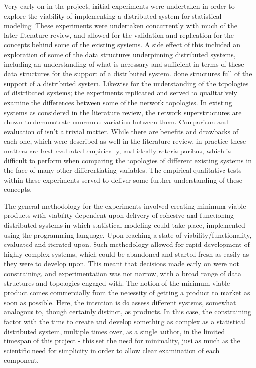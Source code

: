 Very early on in the project, initial experiments were undertaken in order to explore the viability of implementing a distributed system for statistical modeling. 
These experiments were undertaken concurrently with much of the later literature review, and allowed for the validation and replication for the concepts behind some of the existing systems.
A side effect of this included an exploration of some of the data structures underpinning distributed systems, including an understanding of what is necessary and sufficient in terms of these data structures for the support of a distributed system.
done structures full of the support of a distributed system.
Likewise for the understanding of the topologies of distributed systems; the experiments replicated and served to qualitatively examine the differences between some of the network topologies.
In existing systems as considered in the literature review, the network superstructures are shown to demonstrate enormous variation between them.
Comparison and evaluation of isn't a trivial matter.
While there are benefits and drawbacks of each one, which were described as well in the literature review, in practice these matters are best evaluated empirically, and ideally ceteris paribus, which is difficult to perform when comparing the topologies of different existing systems in the face of many other differentiating variables.
The empirical qualitative tests within these experiments served to deliver some further understanding of these concepts.

The general methodology for the experiments involved creating minimum viable products with viability dependent upon delivery of cohesive and functioning distributed systems in which statistical modeling could take place, implemented using the \R{} programming language.
Upon reaching a state of viability/functionality, evaluated and iterated upon.
Such methodology allowed for rapid development of highly complex systems, which could be abandoned and started fresh as easily as they were to develop upon.
This meant that decisions made early on were not constraining, and experimentation was not narrow, with a broad range of data structures and topologies engaged with.
The notion of the minimum viable product comes commercially from the necessity of getting a product to market as soon as possible.
Here, the intention is do assess different systems, somewhat analogous to, though certainly distinct, as products.
In this case, the constraining factor with the time to create and develop something as complex as a statistical distributed system, multiple times over, as a single author, in the limited timespan of this project - this set the need for minimality, just as much as the scientific need for simplicity in order to allow clear examination of each component.

